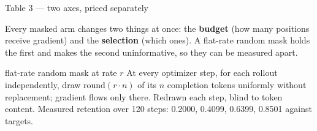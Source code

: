 \documentclass[aspectratio=169,11pt]{beamer}
\newcommand{\aside}[1]{{\footnotesize\textcolor{mut}{#1}}}
\begin{document}
\begin{frame}{Table 3 --- two axes, priced separately}

\aside{Every masked arm changes two things at once: the \textbf{budget} (how many positions
receive gradient) and the \textbf{selection} (which ones). A flat-rate random mask holds the
first and makes the second uninformative, so they can be measured apart.}

\vspace{0.3em}
\begin{block}{\small flat-rate random mask at rate $r$}
\small At every optimizer step, for each rollout independently, draw
$\mathrm{round}(r\cdot n)$ of its $n$ completion tokens uniformly without replacement;
gradient flows only there. Redrawn each step, blind to token content.
\aside{Measured retention over 120 steps: 0.2000, 0.4099, 0.6399, 0.8501 against targets.}
\end{block}


\end{frame}
\end{document}
